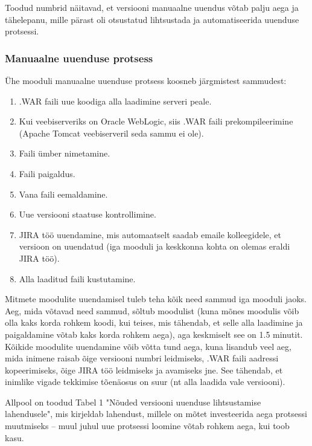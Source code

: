 \documentclass[12pt]{report}
\begin{document}
  Toodud numbrid näitavad, et versiooni manuaalne uuendus võtab palju aega ja tähelepanu, mille pärast oli otsustatud lihtsustada ja automatiseerida uuenduse protsessi.
  
  \subsubsection{Manuaalne uuenduse protsess}
  
  Ühe mooduli manuaalne uuenduse protsess koosneb järgmistest sammudest:
  
  \begin{enumerate}
    \item .WAR faili uue koodiga alla laadimine serveri peale.
    \item Kui veebiserveriks on Oracle WebLogic, siis .WAR faili prekompileerimine (Apache Tomcat veebiserveril seda sammu ei ole).
    \item Faili ümber nimetamine.
    \item Faili paigaldus.
    \item Vana faili eemaldamine.
    \item Uue versiooni staatuse kontrollimine.
    \item JIRA töö uuendamine, mis automaatselt saadab emaile kolleegidele, et versioon on uuendatud (iga mooduli ja keskkonna kohta on olemas eraldi JIRA töö).
    \item Alla laaditud faili kustutamine.
  \end{enumerate}
  
  Mitmete moodulite uuendamisel tuleb teha kõik need sammud iga mooduli jaoks. Aeg, mida võtavad need sammud, sõltub moodulist (kuna mõnes moodulis võib olla kaks korda rohkem koodi, kui teises, mis tähendab, et selle alla laadimine ja paigaldamine võtab kaks korda rohkem aega), aga keskmiselt see on 1.5 minutit. Kõikide moodulite uuendamine võib võtta tund aega, kuna lisandub veel aeg, mida inimene raisab õige versiooni numbri leidmiseks, .WAR faili aadressi kopeerimiseks, õige JIRA töö leidmiseks ja avamiseks jne. See tähendab, et inimlike vigade tekkimise tõenäosus on suur (nt alla laadida vale versiooni).
  
  Allpool on toodud Tabel 1 "Nõuded versiooni uuenduse lihtsustamise lahendusele", mis kirjeldab lahendust, millele on mõtet investeerida aega protsessi muutmiseks \--- muul juhul uue protsessi loomine võtab rohkem aega, kui toob kasu.
  
\end{document}
